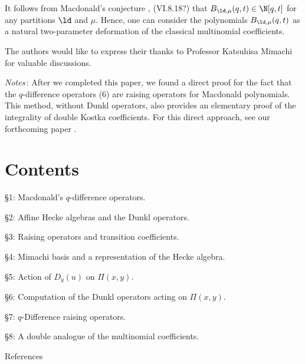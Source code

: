 %
\noindent
It follows from Macdonald's conjecture \cite{Ma1}, (VI.8.18?) that
  $B_{\ld,\mu}(q,t)\in \N[q,t]$ for any partitions 
$\ld$ and $\mu$. 
\endproclaim
%
\noindent
Hence, one can consider the polynomials $B_{\ld,\mu}(q,t)$ as a natural 
two-parameter deformation of the classical multinomial coefficients. 
\par\medpagebreak\par
The authors would like to express their thanks to Professor Katsuhisa Mimachi 
for valuable discussions. 
\par\medpagebreak
{\it Notes\,}: 
After we completed this paper, we found a direct proof for the 
fact that the $q$-difference operators (6) are raising operators 
for Macdonald polynomials. 
This method, without Dunkl operators, also provides an elementary 
proof of the integrality of double Kostka coefficients. 
For this direct approach, see our forthcoming paper \cite{KN}.  
\par\newpage
%
\section{\qquad Contents}
\par \qquad\S1:  Macdonald's $q$-difference operators.
\par \qquad\S2:  Affine Hecke algebras and the Dunkl operators.
\par \qquad\S3:  Raising operators and transition coefficients.
\par \qquad\S4:  Mimachi basis and a representation of the Hecke algebra.
\par \qquad\S5:  Action of $D_y(u)$ on $\Pi(x,y)$.
\par \qquad\S6:  Computation of the Dunkl operators acting on $\Pi(x,y)$.
\par \qquad\S7:  $q$-Difference raising operators. 
\par \qquad\S8:  A double analogue of the multinomial coefficients. 
\par\smallpagebreak
\par\qquad References
%
\par\newpage
